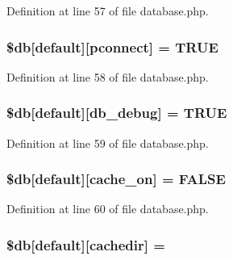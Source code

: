 Definition at line 57 of file database.\+php.

\subsubsection[{\texorpdfstring{\$db}{$db}}]{\setlength{\rightskip}{0pt plus 5cm}\$db\mbox{[}\textquotesingle{}default\textquotesingle{}\mbox{]}\mbox{[}\textquotesingle{}pconnect\textquotesingle{}\mbox{]} = T\+R\+UE}\hypertarget{database_8php_a0bf35d484095b6728c2666580924569b}{}\label{database_8php_a0bf35d484095b6728c2666580924569b}


Definition at line 58 of file database.\+php.

\subsubsection[{\texorpdfstring{\$db}{$db}}]{\setlength{\rightskip}{0pt plus 5cm}\$db\mbox{[}\textquotesingle{}default\textquotesingle{}\mbox{]}\mbox{[}\textquotesingle{}db\+\_\+debug\textquotesingle{}\mbox{]} = T\+R\+UE}\hypertarget{database_8php_aa79c6a73d78063a2b2ee6903a9851908}{}\label{database_8php_aa79c6a73d78063a2b2ee6903a9851908}


Definition at line 59 of file database.\+php.

\subsubsection[{\texorpdfstring{\$db}{$db}}]{\setlength{\rightskip}{0pt plus 5cm}\$db\mbox{[}\textquotesingle{}default\textquotesingle{}\mbox{]}\mbox{[}\textquotesingle{}cache\+\_\+on\textquotesingle{}\mbox{]} = F\+A\+L\+SE}\hypertarget{database_8php_a05a82adb11460f351c1df4ae9be71866}{}\label{database_8php_a05a82adb11460f351c1df4ae9be71866}


Definition at line 60 of file database.\+php.

\subsubsection[{\texorpdfstring{\$db}{$db}}]{\setlength{\rightskip}{0pt plus 5cm}\$db\mbox{[}\textquotesingle{}default\textquotesingle{}\mbox{]}\mbox{[}\textquotesingle{}cachedir\textquotesingle{}\mbox{]} = \textquotesingle{}\textquotesingle{}}\hypertarget{database_8php_a12683252490249e3294aebaca97c4126}{}\label{database_8php_a12683252490249e3294aebaca97c4126}


